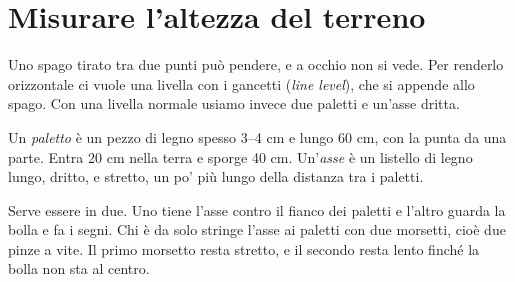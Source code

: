 \documentclass[11pt,a4paper]{article}
\begin{document}
\section{Misurare l'altezza del terreno}
Uno spago tirato tra due punti può pendere, e a occhio non si vede. Per renderlo orizzontale ci vuole una livella con i gancetti (\textit{line level}), che si appende allo spago. Con una livella normale usiamo invece due paletti e un'asse dritta.

Un \emph{paletto} è un pezzo di legno spesso 3--4 cm e lungo 60 cm, con la punta da una parte. Entra 20 cm nella terra e sporge 40 cm. Un'\emph{asse} è un listello di legno lungo, dritto, e stretto, un po' più lungo della distanza tra i paletti.

Serve essere in due. Uno tiene l'asse contro il fianco dei paletti e l'altro guarda la bolla e fa i segni. Chi è da solo stringe l'asse ai paletti con due morsetti, cioè due pinze a vite. Il primo morsetto resta stretto, e il secondo resta lento finché la bolla non sta al centro.
\par\nopagebreak
\newcommand{\apterra}{\fill[mSoil] (-1,-1.1)--(-1,.05) to[out=5,in=175] (3.5,-.35) to[out=-5,in=185] (8,-.05)--(8,-1.1)--cycle;
  \foreach \x in {0,7}{\draw[mat=mWood] (\x-.13,-.8) rectangle (\x+.13,2);}}
\newcommand{\apasse}[2]{\begin{scope}[shift={(0,1.2)},rotate=#1]
  \draw[fill=mWood!50,draw=mWood!70!black] (-.5,-.18) rectangle (7.5,.18);
  \draw[mat=mLevel,rounded corners=1pt] (2.7,.18) rectangle (4.3,.62);
  \draw[fill=mLawn!50,draw=mLevel!60!black,rounded corners=1pt] (3,.28) rectangle (4,.52);
  \draw (3.37,.28)--(3.37,.52) (3.63,.28)--(3.63,.52);
  \draw[fill=white] (3.5+#2,.4) ellipse [x radius=.11,y radius=.08];\end{scope}}
\newcommand{\apsegni}{\foreach \x in {0,7}{\draw[mString,line width=1.5pt] (\x-.35,1.38)--(\x+.35,1.38);}}
\newcommand{\appasso}[2]{\node[anchor=south west,text width=7cm,font=\small,inner sep=0pt] at (-1,2.75) {\textbf{#1}\quad #2};}
\end{document}
